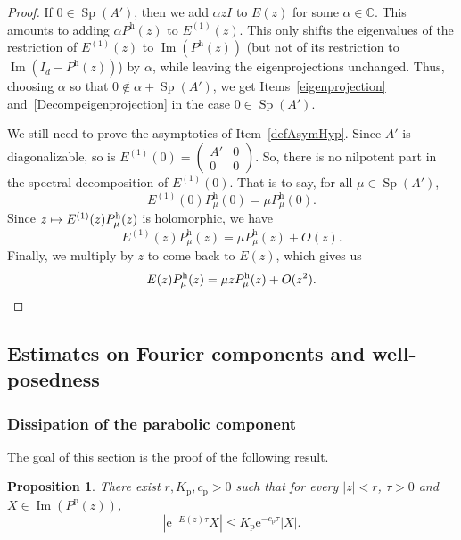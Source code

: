 \documentclass[11pt]{article}
\newcommand{\Subsection}{\subsection}
\def\mto{\mathchoice{\longmapsto}{\mapsto}{\mapsto}{\mapsto}}
\theoremstyle{plain}
\newtheorem{prop}[theorem]{Proposition}
\theoremstyle{definition}
\theoremstyle{remark}
\DeclareMathOperator{\Sp}{Sp}
\DeclareMathOperator{\Ima}{Im}
\let\bigO O
\newcommand{\set}{\mathbb}
\newcommand{\h}{{\mathrm h}}
\newcommand{\p}{{\mathrm p}}
\newcommand{\eu}{\mathrm e}
\begin{document}
\begin{proof}
If $0\in\Sp(A')$, then we add $\alpha zI$ to $E(z)$ for some $\alpha\in\set C$. This amounts to adding $\alpha P^\h(z)$ to $E^{(1)}(z)$. This only shifts the eigenvalues of the restriction of $E^{(1)}(z)$ to $\Ima(P^\h(z))$ (but not of its restriction to $\Ima(I_d-P^\h(z))$) by $\alpha$, while leaving the eigenprojections unchanged. Thus, choosing $\alpha$ so that $0\notin \alpha+\Sp(A')$, we get Items~\eqref{eigenprojection} and~\eqref{Decompeigenprojection} in the case $0\in\Sp(A')$.

We still need to prove the asymptotics of Item~\eqref{defAsymHyp}. Since $A'$ is diagonalizable, so is $E^{(1)}(0) = (\begin{smallmatrix} A'&0\\0&0 \end{smallmatrix})$. So, there is no nilpotent part in the spectral decomposition of $E^{(1)}(0)$. That is to say, for all $\mu\in\Sp(A')$,
\[
E^{(1)}(0)P_\mu^\h(0) = \mu P_\mu^\h(0).
\]
Since $z\mto E^{(1)}(z)P_\mu^\h(z)$ is holomorphic, we have
\[
E^{(1)}(z)P_\mu^\h(z) = \mu P_\mu^\h(z)+\bigO(z).
\]
Finally, we multiply by $z$ to come back to $E(z)$, which gives us
\[
E(z)P_\mu^\h(z) = \mu zP_\mu^\h(z)+\bigO(z^2).\qedhere
\]
\end{proof}

\Subsection{Estimates on Fourier components and well-posedness}
\label{subsubsec:EF_WP}

\subsubsection{Dissipation of the parabolic component}\label{subsubsec:dissipation}

The goal of this section is the proof of the following result.

\begin{prop} \label{Prop:dissip_p}
There exist $r, K_\p, c_\p >0$ such that for every $|z|<r$, $\tau >0$ and $X\in\Ima(P^\p(z))$,
\[
|\eu^{- E(z) \tau} X | \leq K_\p \eu^{-c_\p \tau} |X|.
\]
\end{prop}
\end{document}
